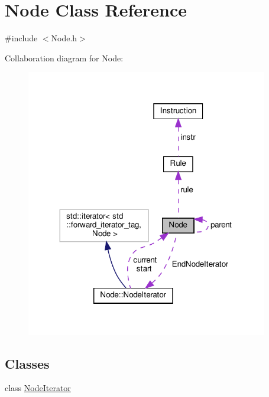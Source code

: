 \hypertarget{class_node}{}\section{Node Class Reference}
\label{class_node}


{\ttfamily \#include $<$Node.\+h$>$}



Collaboration diagram for Node\+:\nopagebreak
\begin{figure}[H]
\begin{center}
\leavevmode
\includegraphics[width=299pt]{class_node__coll__graph}
\end{center}
\end{figure}
\subsection*{Classes}
\begin{DoxyCompactItemize}
\item 
class \hyperlink{class_node_1_1_node_iterator}{Node\+Iterator}
\end{DoxyCompactItemize}
